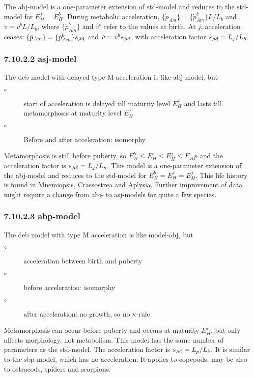 The abj-model is a one-parameter extension of std-model and reduces to the std-model for $E_H^j = E_H^b$.
During metabolic acceleration, $\{\dot{p}_{Am}\} = \{\dot{p}_{Am}^b\} L/ L_b$ and $\dot{v} = \dot{v}^b L/ L_b$, 
  where $\{\dot{p}_{Am}^b\}$ and $\dot{v}^b$ refer to the values at birth.
At $j$, acceleration ceases: $\{\dot{p}_{Am}\} = \{\dot{p}_{Am}^b\} s_{\cal M}$ and $\dot{v} = \dot{v}^b s_{\cal M}$, 
  with acceleration factor $s_{\cal M} = L_j/ L_b$.
 
\subsubsection*{7.10.2.2 asj-model}
{}
\label{sec_c:asj}

The {\sc deb} model with delayed type {\cal M} acceleration is like abj-model, but 
\begin{description}
  \item[$\circ$] start of acceleration is delayed till maturity level $E_H^s$ and lasts till metamorphosis at maturity level $E_H^j$
	
  \item[$\circ$] Before and after acceleration: isomorphy
\end{description}
Metamorphosis is still before puberty, so $E_H^b \le E_H^s \le E_H^j \le E_Hp$ and the acceleration factor is $s_{\cal M} = L_j/ L_s$.
This model is a one-parameter extension of the abj-model and reduces to the std-model for $E_H^b = E_H^s = E_H^j$.
This life history is found in Mnemiopsis, Crassostrea and Aplysia.
Further improvement of data might require a change from abj- to asj-models for quite a few species.

\subsubsection*{7.10.2.3 abp-model}
{}
\label{sec_c:abp}

The {\sc deb} model with type {\cal M} acceleration is like model-abj, but 
\begin{description}
  \item[$\circ$] acceleration between birth and puberty
	
  \item[$\circ$] before acceleration: isomorphy
	
  \item[$\circ$] after acceleration: no growth, so no $\kappa$-rule
\end{description}
Metamorphosis can occur before puberty and occurs at maturity $E_H^j$, but only affects morphology, not metabolism.
This model has the same number of parameters as the std-model.
The acceleration factor is $s_{\cal M} = L_p/ L_b$. 
It is similar to the sbp-model, which has no acceleration.
It applies to copepods, may be also to ostracods, spiders and scorpions.

